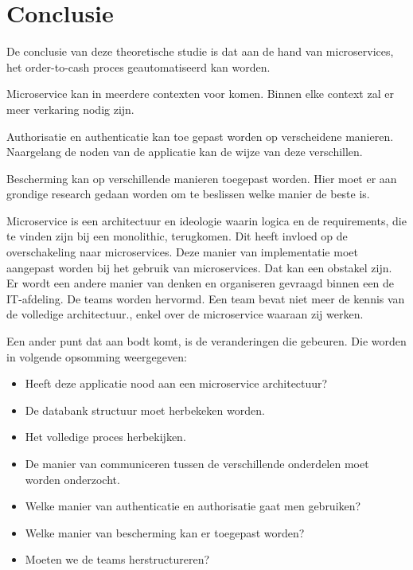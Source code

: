 
\chapter{Conclusie}
\label{ch:conclusie}


De conclusie van deze theoretische studie is dat aan de hand van microservices, het order-to-cash proces geautomatiseerd kan worden. 

Microservice kan in meerdere contexten voor komen. Binnen elke context zal er meer verkaring nodig zijn.

Authorisatie en authenticatie kan toe gepast worden op verscheidene manieren. Naargelang de noden van de applicatie kan de wijze van deze verschillen. 

Bescherming kan op verschillende manieren toegepast worden. Hier moet er aan grondige research gedaan worden om te beslissen welke manier de beste is. 

Microservice is een architectuur en ideologie waarin logica en de requirements, die te vinden zijn bij een monolithic, terugkomen. Dit heeft invloed op de overschakeling naar microservices. Deze manier van implementatie moet aangepast worden bij het gebruik van microservices. Dat kan een obstakel zijn. Er wordt een andere manier van denken en organiseren gevraagd binnen een de IT-afdeling. De teams worden hervormd. Een team bevat niet meer de kennis van de volledige architectuur., enkel over de microservice waaraan zij werken. 

Een ander punt dat aan bodt komt, is de veranderingen die gebeuren. Die worden in volgende opsomming weergegeven:
\begin{itemize}
	\item Heeft deze applicatie nood aan een microservice architectuur?
	\item De databank structuur moet herbekeken worden.
	\item Het volledige proces herbekijken.
	\item De manier van communiceren tussen de verschillende onderdelen moet worden onderzocht.
	\item Welke manier van authenticatie en authorisatie gaat men gebruiken?
	\item Welke manier van bescherming kan er toegepast worden?
	\item Moeten we de teams herstructureren?
\end{itemize}

